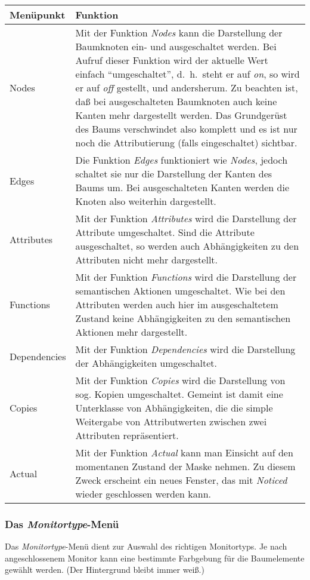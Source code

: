 \bigskip
\begin{tabular}{|l|p{9.8cm}|}
\hline
Men\"upunkt               & Funktion      \\
\hline
Nodes &
Mit der Funktion {\it Nodes} kann die Darstellung der Baumknoten ein- und ausgeschaltet werden. Bei Aufruf dieser Funktion wird der aktuelle Wert
einfach "`umgeschaltet"', d.~h.\ steht er auf {\it on}, so wird er auf {\it off} gestellt, und andersherum. Zu beachten ist, da\ss{} bei ausgeschalteten
Baumknoten auch keine Kanten mehr dargestellt werden. Das Grundger\"ust des Baums verschwindet also komplett und es ist nur noch die Attributierung
(falls eingeschaltet) sichtbar. \\ Edges & Die Funktion {\it Edges} funktioniert wie {\it Nodes}, jedoch schaltet sie nur die
Darstellung der Kanten des Baums um. Bei ausgeschalteten Kanten werden die Knoten also weiterhin dargestellt. \\ Attributes & Mit der Funktion
{\it Attributes} wird die Darstellung der Attribute umgeschaltet. Sind die Attribute ausgeschaltet, so werden auch Abh\"angigkeiten zu den Attributen
nicht mehr dargestellt. \\ Functions & Mit der Funktion {\it Functions} wird die Darstellung der semantischen Aktionen umgeschaltet. Wie bei den
Attributen werden auch hier im ausgeschaltetem Zustand keine Abh\"angigkeiten zu den semantischen Aktionen mehr dargestellt. \\
Dependencies & Mit der Funktion {\it Dependencies} wird die Darstellung der Abh\"angigkeiten umgeschaltet. \\ Copies & Mit der Funktion {\it Copies}
wird die Darstellung von sog. Kopien umgeschaltet. Gemeint ist damit eine Unterklasse von Abh\"angigkeiten, die die simple Weitergabe von Attributwerten
zwischen zwei Attributen repr\"asentiert. \\ Actual & Mit der Funktion {\it Actual} kann man Einsicht auf den momentanen Zustand der Maske nehmen. Zu
diesem Zweck erscheint ein neues Fenster, das mit {\it Noticed} wieder geschlossen werden kann. \\ \hline \end{tabular}



\subsubsection{Das {\it Monitortype}-Men\"u}

Das {\it Monitortype}-Men\"u dient zur Auswahl des richtigen Monitortyps. Je nach angeschlossenem Monitor kann eine bestimmte Farbgebung f\"ur die
Baumelemente gew\"ahlt werden. (Der Hintergrund bleibt immer wei\ss{}.)


